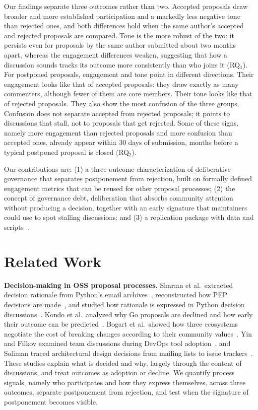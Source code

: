\documentclass[conference]{IEEEtran}
\begin{document}
Our findings separate three outcomes rather than two. Accepted proposals draw broader and more established participation and a markedly less negative tone than rejected ones, and both differences hold when the same author's accepted and rejected proposals are compared. Tone is the more robust of the two: it persists even for proposals by the same author submitted about two months apart, whereas the engagement differences weaken, suggesting that how a discussion sounds tracks its outcome more consistently than who joins it (RQ$_1$). For postponed proposals, engagement and tone point in different directions. Their engagement looks like that of accepted proposals: they draw exactly as many commenters, although fewer of them are core members. Their tone looks like that of rejected proposals. They also show the most confusion of the three groups. Confusion does not separate accepted from rejected proposals; it points to discussions that stall, not to proposals that get rejected. Some of these signs, namely more engagement than rejected proposals and more confusion than accepted ones, already appear within 30 days of submission, months before a typical postponed proposal is closed (RQ$_2$).

Our contributions are: (1) a three-outcome characterization of deliberative governance that separates postponement from rejection, built on formally defined engagement metrics that can be reused for other proposal processes; (2) the concept of governance debt, deliberation that absorbs community attention without producing a decision, together with an early signature that maintainers could use to spot stalling discussions; and (3) a replication package with data and scripts~\cite{rrgc2026}.

\section{Related Work}
\textbf{Decision-making in OSS proposal processes.} Sharma et al.\ extracted decision rationale from Python's email archives~\cite{9402135}, reconstructed how PEP decisions are made~\cite{https://doi.org/10.1002/spe.3128}, and studied how rationale is expressed in Python decision discussions~\cite{sharma2024decisions}. Kondo et al.\ analyzed why Go proposals are declined and how early their outcome can be predicted~\cite{kondo2025empirical}. Bogart et al.\ showed how three ecosystems negotiate the cost of breaking changes according to their community values~\cite{bogart2016break}, Yin and Filkov examined team discussions during DevOps tool adoption~\cite{yin2020team}, and Soliman traced architectural design decisions from mailing lists to issue trackers~\cite{soliman2024exploring}. These studies explain what is decided and why, largely through the content of discussions, and treat outcomes as adoption or decline. We quantify process signals, namely who participates and how they express themselves, across three outcomes, separate postponement from rejection, and test when the signature of postponement becomes visible.
\end{document}
